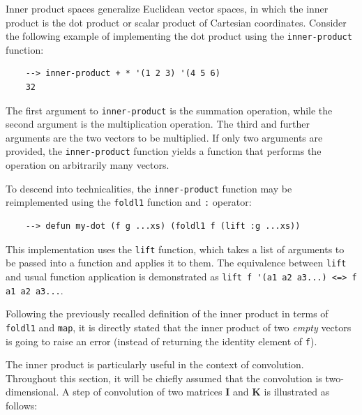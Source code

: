 Inner product spaces generalize Euclidean vector spaces, in which the inner product is the dot product or scalar product of Cartesian coordinates. Consider the following example of implementing the dot product using the \verb|inner-product| function:

\begin{Verbatim}
    --> inner-product + * '(1 2 3) '(4 5 6)
    32
\end{Verbatim}

The first argument to \verb|inner-product| is the summation operation, while the second argument is the multiplication operation. The third and further arguments are the two vectors to be multiplied. If only two arguments are provided, the \verb|inner-product| function yields a function that performs the operation on arbitrarily many vectors.

To descend into technicalities, the \verb|inner-product| function may be reimplemented using the \verb|foldl1| function and \verb|:| operator:

\begin{Verbatim}
    --> defun my-dot (f g ...xs) (foldl1 f (lift :g ...xs))
\end{Verbatim}

This implementation uses the \verb|lift| function, which takes a list of arguments to be passed into a function and applies it to them. The equivalence between \verb|lift| and usual function application is demonstrated as \verb|lift f '(a1 a2 a3...) <=> f a1 a2 a3...|.

Following the previously recalled definition of the inner product in terms of \verb|foldl1| and \verb|map|, it is directly stated that the inner product of two \textit{empty} vectors is going to raise an error (instead of returning the identity element of \verb|f|).

The inner product is particularly useful in the context of convolution. Throughout this section, it will be chiefly assumed that the convolution is two-dimensional. A step of convolution of two matrices $\mathbf{I}$ and $\mathbf{K}$ is illustrated as follows:

